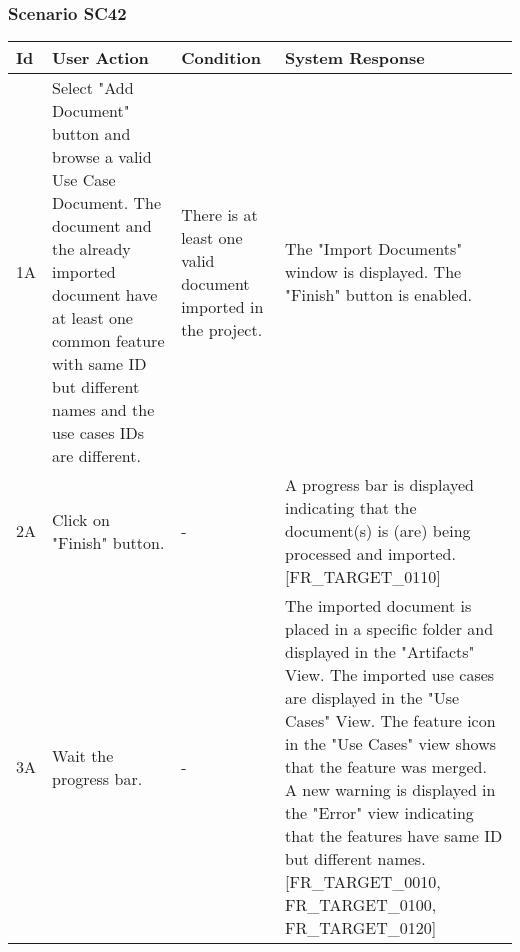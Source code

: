 \documentclass[a4paper,11pt]{article}
\newcommand{\bl}{\\ \hline}
\begin{document}
\subsubsection*{Scenario SC42}
\begin{tabular}{|p{0.4in}|p{1.5in}|p{1.5in}|p{1.5in}|}
\hline
Id & User Action & Condition & System Response \bl 
1A & Select "Add Document" button and browse a valid Use Case
						Document. The document and the already imported document have at
						least one common feature with same ID but different names and the
						use cases IDs are different.  & There is at least one valid document imported in the
						project. & The "Import Documents" window is displayed. The "Finish"
						button is enabled.\bl
2A & Click on "Finish" button. & - & A progress bar is displayed indicating that the
						document(s) is (are) being processed and imported.
						[FR_TARGET_0110] \bl
3A & Wait the progress bar.  & - & The imported document is placed in a specific folder and
						displayed in the "Artifacts" View. The imported use cases are
						displayed in the "Use Cases" View. The feature icon in the "Use
						Cases" view shows that the feature was merged. A new warning is
						displayed in the "Error" view indicating that the features have
						same ID but different names. [FR_TARGET_0010, FR_TARGET_0100,
						FR_TARGET_0120]\bl
\end{tabular}
\end{document}

